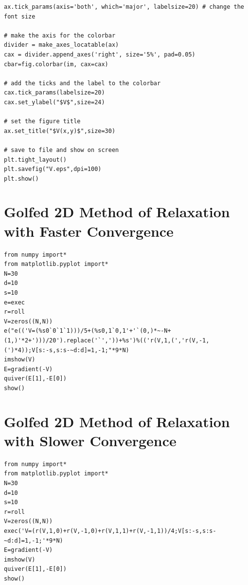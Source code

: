 \documentclass[12pt,twocolumn]{article}
\begin{document}
\begin{verbatim}
ax.tick_params(axis='both', which='major', labelsize=20) # change the font size

# make the axis for the colorbar
divider = make_axes_locatable(ax)
cax = divider.append_axes('right', size='5%', pad=0.05)
cbar=fig.colorbar(im, cax=cax)

# add the ticks and the label to the colorbar
cax.tick_params(labelsize=20)
cax.set_ylabel("$V$",size=24)

# set the figure title
ax.set_title("$V(x,y)$",size=30)

# save to file and show on screen
plt.tight_layout()
plt.savefig("V.eps",dpi=100)
plt.show()
\end{verbatim}
\newpage
\section{Golfed 2D Method of Relaxation with Faster Convergence}
\label{ap:golffast}
\begin{verbatim}
from numpy import*
from matplotlib.pyplot import*
N=30
d=10
s=10
e=exec
r=roll
V=zeros((N,N))
e("e(('V=(%s0`0`1`1)))/5+(%s0,1`0,1'+'`(0,)*~-N+(1,)'*2+')))/20').replace('`','))+%s')%(('r(V,1,(','r(V,-1,(')*4));V[s:-s,s:s-~d:d]=1,-1;"*9*N)
imshow(V)
E=gradient(-V)
quiver(E[1],-E[0])
show()
\end{verbatim}
\section{Golfed 2D Method of Relaxation with Slower Convergence}
\label{ap:golfslow}
\begin{verbatim}
from numpy import*
from matplotlib.pyplot import*
N=30
d=10
s=10
r=roll
V=zeros((N,N))
exec('V=(r(V,1,0)+r(V,-1,0)+r(V,1,1)+r(V,-1,1))/4;V[s:-s,s:s-~d:d]=1,-1;'*9*N)
E=gradient(-V)
imshow(V)
quiver(E[1],-E[0])
show()
\end{verbatim}
\end{document}
